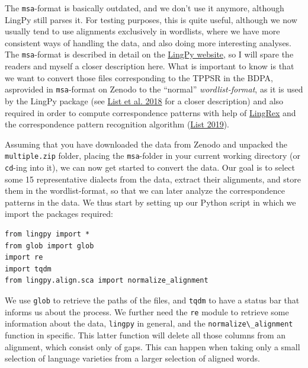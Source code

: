 \documentclass[
  a4paper,
  14pt,
  oneside,
  tablecaptionabove
]{scrbook}
\newcommand{\passthrough}[1]{#1}
\begin{document}
The \passthrough{\lstinline!msa!}-format is basically outdated, and we
don't use it anymore, although LingPy still parses it. For testing
purposes, this is quite useful, although we now usually tend to use
alignments exclusively in wordlists, where we have more consistent ways
of handling the data, and also doing more interesting analyses. The
\passthrough{\lstinline!msa!}-format is described in detail on the
\href{http://lingpy.org/tutorial/formats.html\#multiple-alignments-msq-and-msa}{LingPy
website}, so I will spare the readers and myself a closer description
here. What is important to know is that we want to convert those files
corresponding to the TPPSR in the BDPA, asprovided in
\passthrough{\lstinline!msa!}-format on Zenodo to the \enquote{normal}
\emph{wordlist-format}, as it is used by the LingPy package (see
\href{http://bibliography.lingpy.org?key=List2018d}{List et al. 2018}
for a closer description) and also required in order to compute
correspondence patterns with help of
\href{https://github.com/lingpy/lingrex}{LingRex} and the correspondence
pattern recognition algorithm (\href{http://bibliography.lingpy.org?key=List2019a}{List 2019}).

Assuming that you have downloaded the data from Zenodo and unpacked the
\passthrough{\lstinline!multiple.zip!} folder, placing the
\passthrough{\lstinline!msa!}-folder in your current working directory
(or \passthrough{\lstinline!cd!}-ing into it), we can now get started to
convert the data. Our goal is to select some 15 representative dialects
from the data, extract their alignments, and store them in the
wordlist-format, so that we can later analyze the correspondence
patterns in the data. We thus start by setting up our Python script in
which we import the packages required:

\begin{lstlisting}
from lingpy import *
from glob import glob
import re
import tqdm
from lingpy.align.sca import normalize_alignment
\end{lstlisting}

We use \passthrough{\lstinline!glob!} to retrieve the paths of the
files, and \passthrough{\lstinline!tqdm!} to have a status bar that
informs us about the process. We further need the
\passthrough{\lstinline!re!} module to retrieve some information about
the data, \passthrough{\lstinline!lingpy!} in general, and the
\passthrough{\lstinline!normalize\_alignment!} function in specific.
This latter function will delete all those columns from an alignment,
which consist only of gaps. This can happen when taking only a small
selection of language varieties from a larger selection of aligned
words.
\end{document}
